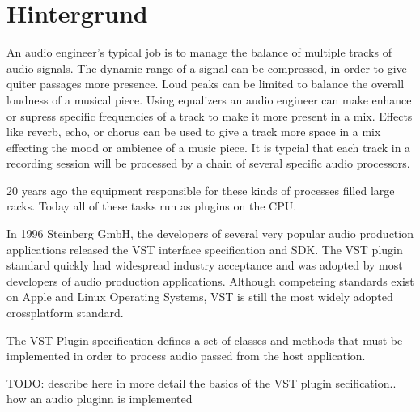 \section{Hintergrund}

An audio engineer's typical job is to manage the balance of multiple tracks of audio signals. The dynamic range of a
signal can be compressed, in order to give quiter passages more presence. Loud peaks can be limited to balance the
overall loudness of a musical piece. Using equalizers an audio engineer can make enhance or supress specific
frequencies of a track to make it more present in a mix. Effects like reverb, echo, or chorus can be used to give a
track more space in a mix effecting the mood or ambience of a music piece. It is typcial that each track in a
recording session will be processed by a chain of several specific audio processors.

20 years ago the equipment responsible for these kinds of processes filled large racks. Today all of these tasks run
as plugins on the CPU.

In 1996 Steinberg GmbH, the developers of several very popular audio production applications released the VST
interface specification and SDK.\cite{VST-wikipedia} The VST plugin standard quickly had widespread industry
acceptance and was adopted by most developers of audio production applications. Although competeing standards exist
on Apple and Linux Operating Systems, VST is still the most widely adopted crossplatform standard.

The VST Plugin specification defines a set of classes and methods that must be implemented in order to process audio
passed from the host application.

TODO: describe here in more detail the basics of the VST plugin secification.. how an audio pluginn is implemented
